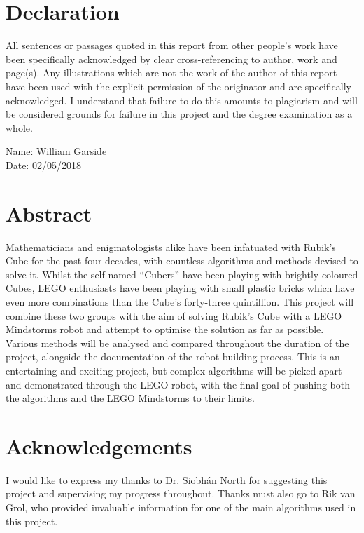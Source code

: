 \documentclass{report}
\newcommand{\lego}{LEGO }
\begin{document}
	
	\newpage
	
	\renewcommand{\thechapter}{\Roman{chapter}}
	\chapter{Declaration}
	All sentences or passages quoted in this report from other people's work have been specifically acknowledged by clear cross-referencing to author, work and page(s). Any illustrations which are not the work of the author of this report have been used with the explicit permission of the originator and are specifically acknowledged. I understand that failure to do this amounts to plagiarism and will be considered grounds for failure in this project and the degree examination as a whole.
	
	Name: William Garside\\
	Date: 02/05/2018

	\newpage
	\chapter{Abstract}
	Mathematicians and enigmatologists alike have been infatuated with Rubik's Cube for the past four decades, with countless algorithms and methods devised to solve it. Whilst the self-named \enquote{Cubers} have been playing with brightly coloured Cubes, \lego enthusiasts have been playing with small plastic bricks which have even more combinations than the Cube's forty-three quintillion. This project will combine these two groups with the aim of solving Rubik's Cube with a \lego Mindstorms robot and attempt to optimise the solution as far as possible. Various methods will be analysed and compared throughout the duration of the project, alongside the documentation of the robot building process. This is an entertaining and exciting  project, but complex algorithms will be picked apart and demonstrated through the \lego robot, with the final goal of pushing both the algorithms and the \lego Mindstorms to their limits.
	
	\newpage
	\chapter{Acknowledgements}
	I would like to express my thanks to Dr. Siobh\'{a}n North for suggesting this project and supervising my progress throughout. Thanks must also go to Rik van Grol, who provided invaluable information for one of the main algorithms used in this project.
	
\end{document}
